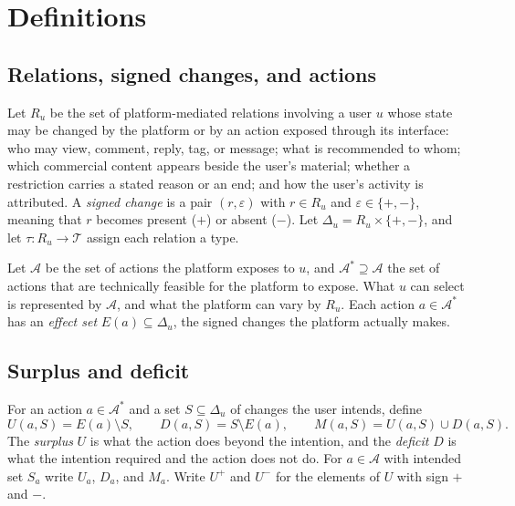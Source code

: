 
\section{Definitions}\label{sec:defs}

\subsection{Relations, signed changes, and actions}

\begin{definition}
Let $R_u$ be the set of platform-mediated relations involving a user $u$ whose state may be changed by the platform or by an action exposed through its interface: who may view, comment, reply, tag, or message; what is recommended to whom; which commercial content appears beside the user's material; whether a restriction carries a stated reason or an end; and how the user's activity is attributed. A \emph{signed change} is a pair $(r,\varepsilon)$ with $r\in R_u$ and $\varepsilon\in\{+,-\}$, meaning that $r$ becomes present ($+$) or absent ($-$). Let $\Delta_u=R_u\times\{+,-\}$, and let $\tau:R_u\to\mathcal{T}$ assign each relation a type.
\end{definition}

\begin{definition}
Let $\mathcal{A}$ be the set of actions the platform exposes to $u$, and $\mathcal{A}^{*}\supseteq\mathcal{A}$ the set of actions that are technically feasible for the platform to expose. What $u$ can select is represented by $\mathcal{A}$, and what the platform can vary by $R_u$. Each action $a\in\mathcal{A}^{*}$ has an \emph{effect set} $E(a)\subseteq\Delta_u$, the signed changes the platform actually makes.
\end{definition}

\subsection{Surplus and deficit}

\begin{definition}
For an action $a\in\mathcal{A}^{*}$ and a set $S\subseteq\Delta_u$ of changes the user intends, define
\[
U(a,S)=E(a)\setminus S,\qquad
D(a,S)=S\setminus E(a),\qquad
M(a,S)=U(a,S)\cup D(a,S).
\]
The \emph{surplus} $U$ is what the action does beyond the intention, and the \emph{deficit} $D$ is what the intention required and the action does not do. For $a\in\mathcal{A}$ with intended set $S_a$ write $U_a$, $D_a$, and $M_a$. Write $U^{+}$ and $U^{-}$ for the elements of $U$ with sign $+$ and $-$.
\end{definition}

